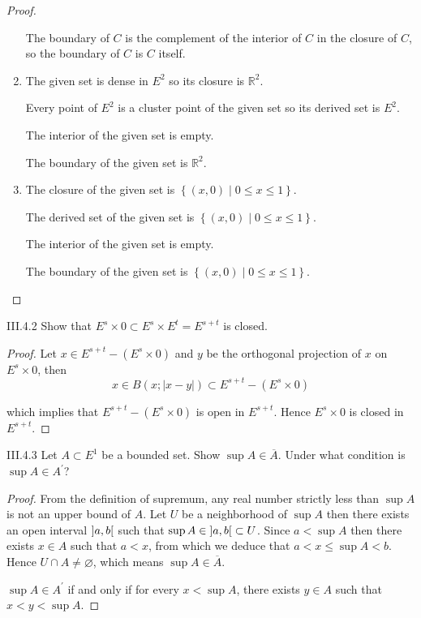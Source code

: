 \begin{proof}
\begin{enumerate}[label={(\alph*)},itemsep=0pt]
              The boundary of \( C \) is the complement of the interior of \( C \) in the closure of \( C \), so the boundary of \(C\) is \(C\) itself.
        \item The given set is dense in \( E^{2} \) so its closure is \( \mathbb{R}^{2} \).

              Every point of \( E^{2} \) is a cluster point of the given set so its derived set is \( E^{2} \).

              The interior of the given set is empty.

              The boundary of the given set is \( \mathbb{R}^{2} \).
        \item The closure of the given set is \( \left\{ (x, 0) \mid 0 \le x \le 1 \right\} \).

              The derived set of the given set is \( \left\{ (x, 0) \mid 0 \le x \le 1 \right\} \).

              The interior of the given set is empty.

              The boundary of the given set is \( \left\{ (x, 0) \mid 0 \le x \le 1 \right\} \).
    \end{enumerate}
\end{proof}

\begin{problem}{III.4.2}
Show that \( E^{s} \times 0 \subset E^{s} \times E^{t} = E^{s+t} \) is closed.
\end{problem}

\begin{proof}
    Let \( x \in E^{s+t} - (E^{s}\times 0) \) and \( y \) be the orthogonal projection of \( x \) on \( E^{s} \times 0 \), then
    \[
        x \in B(x; \left\vert x - y \right\vert) \subset E^{s+t} - (E^{s}\times 0)
    \]

    which implies that \( E^{s+t} - (E^{s}\times 0) \) is open in \( E^{s+t} \). Hence \( E^{s}\times 0 \) is closed in \( E^{s+t} \).
\end{proof}

\begin{problem}{III.4.3}
Let \( A \subset E^{1} \) be a bounded set. Show \( \sup A \in \overline{A} \). Under what condition is \( \sup A \in A^{\prime} \)\@?
\end{problem}

\begin{proof}
    From the definition of supremum, any real number strictly less than \( \sup A \) is not an upper bound of \( A \). Let \( U \) be a neighborhood of \( \sup A \) then there exists an open interval \( \left\rbrack{a, b}\right\lbrack \) such that \( \sup A \in \left\rbrack{a, b}\right\lbrack \subset U \). Since \( a < \sup A \) then there exists \( x \in A \) such that \( a < x \), from which we deduce that \( a < x \le \sup A < b \). Hence \( U \cap A \ne \varnothing \), which means \( \sup A \in \overline{A} \).

    \( \sup A \in A^{\prime} \) if and only if for every \( x < \sup A \), there exists \( y \in A \) such that \( x < y < \sup A \).
\end{proof}

